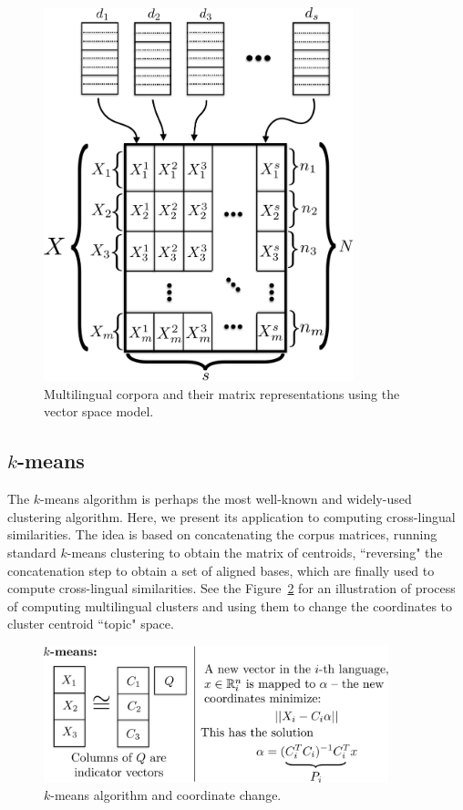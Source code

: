 \documentclass[twoside,11pt]{article}
\begin{document}
\begin{figure}[tbp]
\centering
\includegraphics[width=9cm]{stacked_matrices.pdf}
\caption{\label{fig:stacked_matrices} Multilingual corpora and their matrix representations using the vector space model.}
\end{figure}


\subsection{$k$-means}\label{sec:kmeans}

The $k$-means algorithm is perhaps the most well-known and widely-used clustering algorithm. Here, we present its application
to computing cross-lingual similarities. The idea is based on concatenating the corpus matrices, running standard $k$-means clustering to obtain the matrix of centroids, ``reversing" the concatenation step to obtain a set of aligned bases, which are finally used to compute cross-lingual similarities. See the Figure~\ref{fig:kmeans} for an illustration of process of computing multilingual clusters and using them to change the coordinates to cluster centroid ``topic" space.

\begin{figure}[tbp]
\centering
\includegraphics[width=10cm]{kmeans.pdf}
\caption{\label{fig:kmeans} $k$-means algorithm and coordinate change.}
\end{figure}
\end{document}
